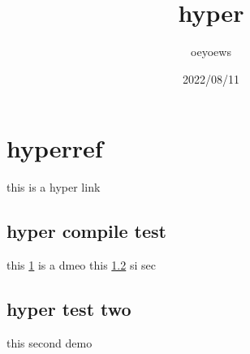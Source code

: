 \documentclass[UTF8]{article}
\title{hyper}
\author{oeyoews}
\date{2022/08/11}
\begin{document}
\maketitle

\section{hyperref}%
\label{sec:hyperref}
this is a hyper link


\subsection{hyper compile test}%
\label{sec:hyper compile test}

this \ref{sec:hyperref} is a dmeo
this \ref{sec:demo} si sec

\subsection{hyper test two}%
\label{sec:demo}

this second \pageref{sec:hyperref} demo
\end{document}
